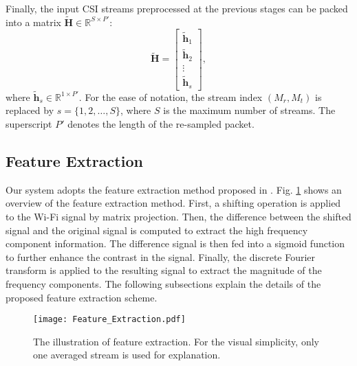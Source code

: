 Finally, the input CSI streams preprocessed at the previous stages can be packed into a matrix $\tilde{\textbf{H}}\in \mathbb{R}^{S\times P'}$:
\begin{equation}
\tilde{\textbf{H}}=
\begin{bmatrix}
\tilde{\textbf{h}}_{1}\\ 
\tilde{\textbf{h}}_{2}\\
\vdots\\
\tilde{\textbf{h}}_{s}
\end{bmatrix},
\end{equation}
where $\tilde{\textbf{h}}_{s}\in \mathbb{R}^{1\times P'}$. For the ease of notation, the stream index $(M_{r}, M_{t})$ is replaced by $s=\{1,2,\dots, S\}$, where $S$ is the maximum number of streams. The superscript $P'$ denotes the length of the re-sampled packet. 


\subsection{Feature Extraction}

Our system adopts the feature extraction method proposed in \cite{Kim2016}. Fig. \ref{fig:Feature} shows an overview of the feature extraction method. First, a shifting operation is applied to the Wi-Fi signal by matrix projection. Then, the difference between the shifted signal and the original signal is computed to extract the high frequency component information. The difference signal is then fed into a sigmoid function to further enhance the contrast in the signal. Finally, the discrete Fourier transform is applied to the resulting signal to extract the magnitude of the frequency components. The following subsections explain the details of the proposed feature extraction scheme. 

\begin{figure}[!h]
	\begin{center}
		\texttt{[image: Feature\_Extraction.pdf]}
	\end{center}
	\caption{The illustration of feature extraction. For the visual simplicity, only one averaged stream is used for explanation. }
	\label{fig:Feature}
\end{figure}


